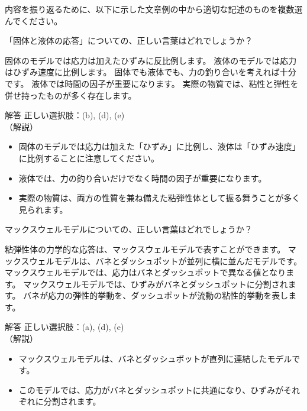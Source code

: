 \documentclass[uplatex,dvipdfmx,a4paper,11pt]{jsarticle}
\begin{document}
内容を振り返るために、以下に示した文章例の中から適切な記述のものを複数選んでください。
\begin{qlist}
	\qitem 「固体と液体の応答」についての、正しい言葉はどれでしょうか？
		\begin{qlist2}
			\qitem 固体のモデルでは応力は加えたひずみに反比例します。
			\qitem 液体のモデルでは応力はひずみ速度に比例します。
			\qitem 固体でも液体でも、力の釣り合いを考えれば十分です。
			\qitem 液体では時間の因子が重要になります。
			\qitem 実際の物質では、粘性と弾性を併せ持ったものが多く存在します。
		\end{qlist2}
		\vspace{3mm}
        \begin{itembox}[l]{解答}
            正しい選択肢：(b), (d), (e)\\
            （解説）
			\begin{itemize}
				\item 固体のモデルでは応力は加えた「ひずみ」に比例し、液体は「ひずみ速度」に比例することに注意してください。
				\item 液体では、力の釣り合いだけでなく時間の因子が重要になります。
				\item 実際の物質は、両方の性質を兼ね備えた粘弾性体として振る舞うことが多く見られます。 
			\end{itemize}
        \end{itembox}
	\qitem マックスウェルモデルについての、正しい言葉はどれでしょうか？
		\begin{qlist2}
			\qitem 粘弾性体の力学的な応答は、マックスウェルモデルで表すことができます。
			\qitem マックスウェルモデルは、バネとダッシュポットが並列に横に並んだモデルです。
			\qitem マックスウェルモデルでは、応力はバネとダッシュポットで異なる値となります。
			\qitem マックスウェルモデルでは、ひずみがバネとダッシュポットに分割されます。
			\qitem バネが応力の弾性的挙動を、ダッシュポットが流動の粘性的挙動を表します。
		\end{qlist2}
		\vspace{3mm}
        \begin{itembox}[l]{解答}
            正しい選択肢：(a), (d), (e)\\
            （解説）
			\begin{itemize}
				\item マックスウェルモデルは、バネとダッシュポットが直列に連結したモデルです。
				\item このモデルでは、応力がバネとダッシュポットに共通になり、ひずみがそれぞれに分割されます。
			\end{itemize}

\end{itembox}
\end{qlist}
\end{document}
